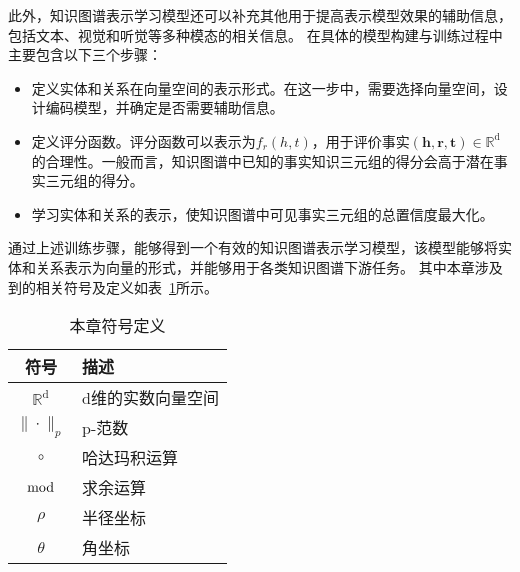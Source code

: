 \documentclass[algorithmlist, AutoFakeBold, AutoFakeSlant, figurelist, tablelist, nomlist, masters]{seuthesix}
\begin{document}
此外，知识图谱表示学习模型还可以补充其他用于提高表示模型效果的辅助信息，包括文本、视觉和听觉等多种模态的相关信息。
在具体的模型构建与训练过程中主要包含以下三个步骤：
\begin{itemize}
  \item [(1)] 定义实体和关系在向量空间的表示形式。在这一步中，需要选择向量空间，设计编码模型，并确定是否需要辅助信息。
  \item [(2)] 定义评分函数。评分函数可以表示为$f_r(h, t)$，用于评价事实$\left(\bm{h}, \bm{r}, \bm{t}\right) \in \mathbb{R}^{\mathrm{d}}$的合理性。一般而言，知识图谱中已知的事实知识三元组的得分会高于潜在事实三元组的得分。
  \item [(3)] 学习实体和关系的表示，使知识图谱中可见事实三元组的总置信度最大化。
\end{itemize}

通过上述训练步骤，能够得到一个有效的知识图谱表示学习模型，该模型能够将实体和关系表示为向量的形式，并能够用于各类知识图谱下游任务。
其中本章涉及到的相关符号及定义如表~\ref{2_symbols}所示。
\begin{table}
  \centering
  \begin{tabular*}{0.4\textwidth}{@{\extracolsep{\fill}}cl}
		\toprule[1pt]
    符号 & 描述 \\ \hline
    $\mathbb{R}^{\mathrm{d}}$ & d维的实数向量空间\\
    $\|\cdot\|_{p}$ & p-范数\\
    $\circ$ & 哈达玛积运算\\
    $\bmod$ & 求余运算\\
    $\rho$ & 半径坐标\\
    $\theta$ & 角坐标\\
		\bottomrule[1pt]
	\end{tabular*}
  \caption{本章符号定义}
  \label{2_symbols}
\end{table}
\end{document}
